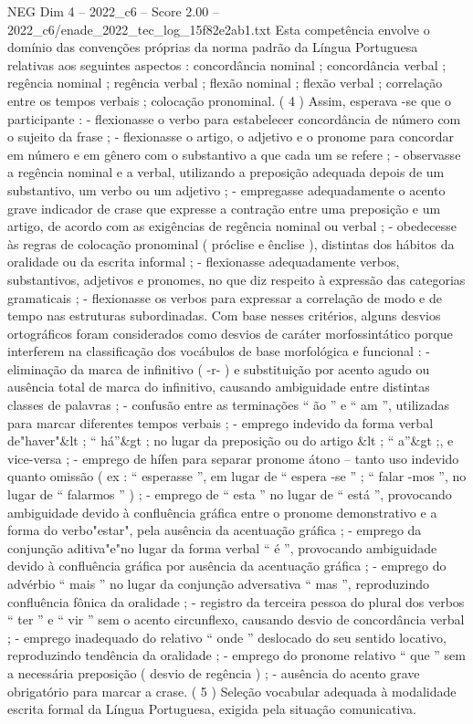 \begin{textsample}{NEG Dim 4 – 2022\_c6 – Score 2.00 – 2022\_c6/enade\_2022\_tec\_log\_15f82e2ab1.txt}
Esta competência envolve o domínio das convenções próprias da norma padrão da Língua Portuguesa relativas aos seguintes aspectos : concordância nominal ; concordância verbal ; regência nominal ; regência verbal ; flexão nominal ; flexão verbal ; correlação entre os tempos verbais ; colocação pronominal. ( 4 ) Assim, esperava -se que o participante : - flexionasse o verbo para estabelecer concordância de número com o sujeito da frase ; - flexionasse o artigo, o adjetivo e o pronome para concordar em número e em gênero com o substantivo a que cada um se refere ; - observasse a regência nominal e a verbal, utilizando a preposição adequada depois de um substantivo, um verbo ou um adjetivo ; - empregasse adequadamente o acento grave indicador de crase que expresse a contração entre uma preposição e um artigo, de acordo com as exigências de regência nominal ou verbal ; - obedecesse às regras de colocação pronominal ( próclise e ênclise ), distintas dos hábitos da oralidade ou da escrita informal ; - flexionasse adequadamente verbos, substantivos, adjetivos e pronomes, no que diz respeito à expressão das categorias gramaticais ; - flexionasse os verbos para expressar a correlação de modo e de tempo nas estruturas subordinadas.
Com base nesses critérios, alguns desvios ortográficos foram considerados como desvios de caráter morfossintático porque interferem na classificação dos vocábulos de base morfológica e funcional : - eliminação da marca de infinitivo ( -r- ) e substituição por acento agudo ou ausência total de marca do infinitivo, causando ambiguidade entre distintas classes de palavras ; - confusão entre as terminações “ ão ” e “ am ”, utilizadas para marcar diferentes tempos verbais ; - emprego indevido da forma verbal de"haver"\&lt ; “ há”\&gt ; no lugar da preposição ou do artigo \&lt ; “ a”\&gt ;, e vice-versa ; - emprego de hífen para separar pronome átono – tanto uso indevido quanto omissão ( ex : “ esperasse ”, em lugar de “ espera -se ” ; “ falar -mos ”, no lugar de “ falarmos ” ) ; - emprego de “ esta ” no lugar de “ está ”, provocando ambiguidade devido à confluência gráfica entre o pronome demonstrativo e a forma do verbo"estar", pela ausência da acentuação gráfica ; - emprego da conjunção aditiva"e"no lugar da forma verbal “ é ”, provocando ambiguidade devido à confluência gráfica por ausência da acentuação gráfica ; - emprego do advérbio “ mais ” no lugar da conjunção adversativa “ mas ”, reproduzindo confluência fônica da oralidade ; - registro da terceira pessoa do plural dos verbos “ ter ” e “ vir ” sem o acento circunflexo, causando desvio de concordância verbal ; - emprego inadequado do relativo “ onde ” deslocado do seu sentido locativo, reproduzindo tendência da oralidade ; - emprego do pronome relativo “ que ” sem a necessária preposição ( desvio de regência ) ; - ausência do acento grave obrigatório para marcar a crase. ( 5 ) Seleção vocabular adequada à modalidade escrita formal da Língua Portuguesa, exigida pela situação comunicativa.

\end{textsample}
